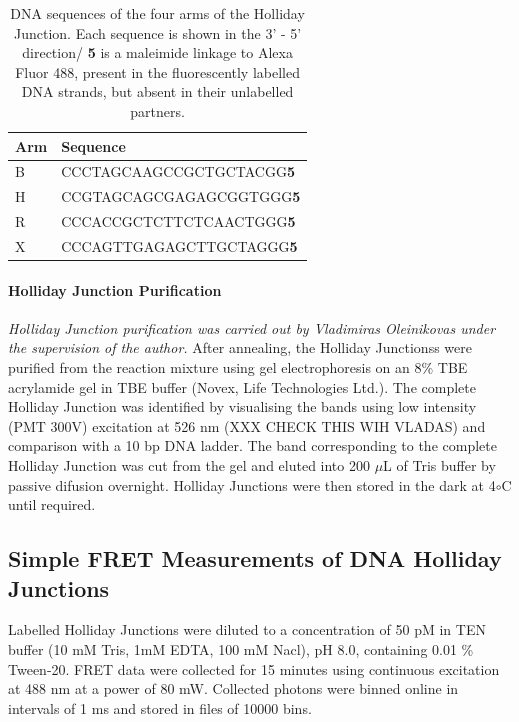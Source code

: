 \begin{center}
\begin{table}[!ht]
\begin{tabular}{|l|l|}
\hline
{\bf Arm} & {\bf Sequence}\\ \hline
B & CCCTAGCAAGCCGCTGCTACGG{\bf 5} \\
H & CCGTAGCAGCGAGAGCGGTGGG{\bf 5} \\
R & CCCACCGCTCTTCTCAACTGGG{\bf 5} \\
X & CCCAGTTGAGAGCTTGCTAGGG{\bf 5} \\ \hline
\end{tabular}
\caption{DNA sequences of the four arms of the Holliday Junction. Each sequence is shown in the 3' - 5' direction/ {\bf 5} is a maleimide linkage to Alexa Fluor 488, present in the fluorescently labelled DNA strands, but absent in their unlabelled partners.}
\label{tab:table1_DNAsequences}
\end{table}
\end{center}


\paragraph{Holliday Junction Purification}
\emph{Holliday Junction purification was carried out by Vladimiras Oleinikovas under the supervision of the author.}
After annealing, the Holliday Junctionss were purified from the reaction mixture using gel electrophoresis on an 8\% TBE acrylamide gel in TBE buffer (Novex, Life Technologies Ltd.). The complete Holliday Junction was identified by visualising the bands using low intensity (PMT 300V) excitation at 526 nm (XXX CHECK THIS WIH VLADAS) and comparison with a 10 bp DNA ladder. The band corresponding to the complete Holliday Junction was cut from the gel and eluted into 200 $\mu$L of Tris buffer by passive difusion overnight. Holliday Junctions were then stored in the dark at 4$\circ$C until required.

\subsection{Simple FRET Measurements of DNA Holliday Junctions}
Labelled Holliday Junctions were diluted to a concentration of 50 pM in TEN buffer (10 mM Tris, 1mM EDTA, 100 mM Nacl), pH 8.0, containing 0.01 \% Tween-20. FRET data were collected for 15 minutes using continuous excitation at 488 nm at a power of 80 mW. Collected photons were binned online in intervals of 1 ms and stored in files of 10000 bins. 


